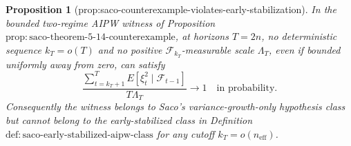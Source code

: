 \documentclass{article}
\newtheorem{proposition}{Proposition}
\begin{document}
\begin{proposition}[prop:saco-counterexample-violates-early-stabilization]\label{prop:saco-counterexample-violates-early-stabilization}
In the bounded two-regime AIPW witness of Proposition~\(\mathrm{prop:saco\text{-}theorem\text{-}5\text{-}14\text{-}counterexample}\), at horizons \(T=2n\), no deterministic sequence \(k_T=o(T)\) and no positive \(\mathcal F_{k_T}\)-measurable scale \(\Lambda_T\), even if bounded uniformly away from zero, can satisfy
\[
\frac{\sum_{t=k_T+1}^{T}E[\xi_t^2\mid\mathcal F_{t-1}]}{T\Lambda_T}\longrightarrow1
\quad\text{in probability}.
\]
Consequently the witness belongs to Saco's variance-growth-only hypothesis class but cannot belong to the early-stabilized class in Definition~\(\mathrm{def:saco\text{-}early\text{-}stabilized\text{-}aipw\text{-}class}\) for any cutoff \(k_T=o(n_{\mathrm{eff}})\).
\end{proposition}
\end{document}
